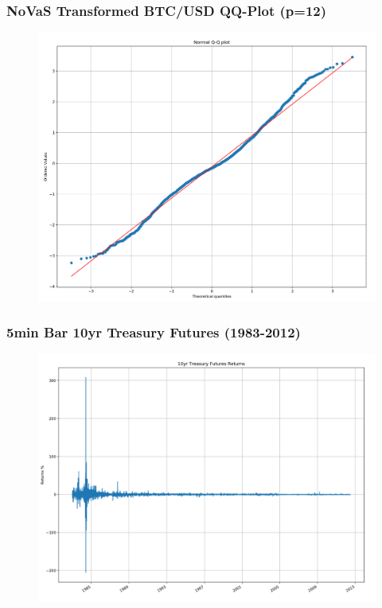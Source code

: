 \documentclass{beamer}
\begin{document}
\begin{frame}
\frametitle{NoVaS Transformed BTC/USD QQ-Plot (p=12)}
\begin{figure}[h!]
\centering 
\includegraphics[width=\textwidth]{novas_btc_returns_qqplot.png}
\end{figure}
\end{frame}


\begin{frame}
\frametitle{5min Bar 10yr Treasury Futures (1983-2012)}
\begin{figure}[h!]
\includegraphics[width=\textwidth]{ty_returns.png}
\end{figure}
\end{frame}
\end{document}
